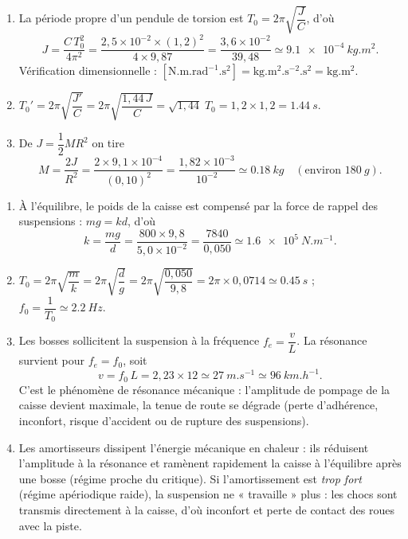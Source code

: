 \documentclass[11pt]{article}
\newcommand{\cle}[1]{{\popxbold\color{popdark}#1}}
\begin{document}
\begin{corrige}
\begin{enumerate}
\item La période propre d'un pendule de torsion est $T_0 = 2\pi\sqrt{\dfrac{J}{C}}$, d'où
\[ J = \dfrac{C\,T_0^2}{4\pi^2} = \dfrac{2{,}5\times 10^{-2}\times (1{,}2)^2}{4\times 9{,}87} = \dfrac{3{,}6\times 10^{-2}}{39{,}48} \simeq \SI{9,1e-4}{kg.m^2}. \]
Vérification dimensionnelle : $[\mathrm{N.m.rad^{-1}.s^2}] = \mathrm{kg.m^2.s^{-2}.s^2} = \mathrm{kg.m^2}$. \checkmark
\item $T_0' = 2\pi\sqrt{\dfrac{J'}{C}} = 2\pi\sqrt{\dfrac{1{,}44\,J}{C}} = \sqrt{1{,}44}\;T_0 = 1{,}2\times 1{,}2 = \SI{1,44}{s}$.
\item De $J = \dfrac{1}{2}MR^2$ on tire
\[ M = \dfrac{2J}{R^2} = \dfrac{2\times 9{,}1\times 10^{-4}}{(0{,}10)^2} = \dfrac{1{,}82\times 10^{-3}}{10^{-2}} \simeq \SI{0,18}{kg} \quad (\text{environ } \SI{180}{g}). \]
\end{enumerate}
\end{corrige}

\begin{corrige}
\begin{enumerate}
\item À l'équilibre, le poids de la caisse est compensé par la force de rappel des suspensions : $mg = kd$, d'où
\[ k = \dfrac{mg}{d} = \dfrac{800\times 9{,}8}{5{,}0\times 10^{-2}} = \dfrac{7840}{0{,}050} \simeq \SI{1,6e5}{N.m^{-1}}. \]
\item $T_0 = 2\pi\sqrt{\dfrac{m}{k}} = 2\pi\sqrt{\dfrac{d}{g}} = 2\pi\sqrt{\dfrac{0{,}050}{9{,}8}} = 2\pi\times 0{,}0714 \simeq \SI{0,45}{s}$ ; \quad $f_0 = \dfrac{1}{T_0} \simeq \SI{2,2}{Hz}$.
\item Les bosses sollicitent la suspension à la fréquence $f_e = \dfrac{v}{L}$. La résonance survient pour $f_e = f_0$, soit
\[ v = f_0\,L = 2{,}23\times 12 \simeq \SI{27}{m.s^{-1}} \simeq \SI{96}{km.h^{-1}}. \]
C'est le phénomène de \cle{résonance mécanique} : l'amplitude de pompage de la caisse devient maximale, la tenue de route se dégrade (perte d'adhérence, inconfort, risque d'accident ou de rupture des suspensions).
\item Les \cle{amortisseurs} dissipent l'énergie mécanique en chaleur : ils réduisent l'amplitude à la résonance et ramènent rapidement la caisse à l'équilibre après une bosse (régime proche du critique). Si l'amortissement est \emph{trop fort} (régime apériodique raide), la suspension ne « travaille » plus : les chocs sont transmis directement à la caisse, d'où inconfort et perte de contact des roues avec la piste.
\end{enumerate}
\end{corrige}
\end{document}
